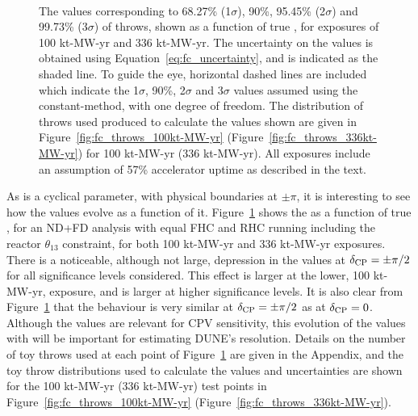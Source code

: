 \begin{figure}[htbp]
  \centering
  \\
  \caption{The \dchisqcrit values corresponding to 68.27\% (1$\sigma$), 90\%, 95.45\% (2$\sigma$) and 99.73\% (3$\sigma$) of throws, shown as a function of true \deltacp, for exposures of 100 kt-MW-yr and 336 kt-MW-yr. The uncertainty on the \dchisqcrit values is obtained using Equation~\ref{eq:fc_uncertainty}, and is indicated as the shaded line. To guide the eye, horizontal dashed lines are included which indicate the 1$\sigma$, 90\%, 2$\sigma$ and 3$\sigma$ \dchisqCPV values assumed using the constant-\dchisq method, with one degree of freedom. The distribution of throws used produced to calculate the \dchisqcrit values shown are given in Figure~\ref{fig:fc_throws_100kt-MW-yr} (Figure~\ref{fig:fc_throws_336kt-MW-yr}) for 100 kt-MW-yr (336 kt-MW-yr). All exposures include an assumption of 57\% accelerator uptime as described in the text.}
  \label{fig:fc_vs_dcp}
\end{figure}
As \deltacp is a cyclical parameter, with physical boundaries at $\pm\pi$, it is interesting to see how the \dchisqcrit values evolve as a function of it. Figure~\ref{fig:fc_vs_dcp} shows the \dchisqcrit as a function of true \deltacp, for an ND+FD analysis with equal FHC and RHC running including the reactor $\theta_{13}$ constraint, for both 100 kt-MW-yr and 336 kt-MW-yr exposures. There is a noticeable, although not large, depression in the \dchisqcrit values at $\delta_{\rm CP} = \pm\pi/2$ for all significance levels considered. This effect is larger at the lower, 100 kt-MW-yr, exposure, and is larger at higher significance levels. It is also clear from Figure~\ref{fig:fc_vs_dcp} that the \dchisqcrit behaviour is very similar at $\delta_{\rm CP} = \pm\pi/2$ as at $\delta_{\rm CP} = 0$. Although the \dchisqcrit values are relevant for CPV sensitivity, this evolution of the \dchisqcrit values with \deltacp will be important for estimating DUNE's \deltacp resolution. Details on the number of toy throws used at each point of Figure~\ref{fig:fc_vs_dcp} are given in the Appendix, and the toy throw distributions used to calculate the \dchisqcrit values and uncertainties are shown for the 100 kt-MW-yr (336 kt-MW-yr) test points in Figure~\ref{fig:fc_throws_100kt-MW-yr} (Figure~\ref{fig:fc_throws_336kt-MW-yr}).

